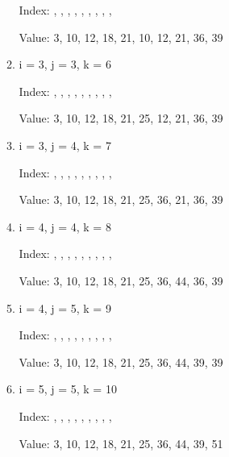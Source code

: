 \documentclass{article}
\begin{document}
\begin{itemize}
\begin{enumerate}
            Index: {, , , , , \space{}, \space{}, , , \space{}}
    
            Value: {3, 10, 12, 18, 21, 10, 12, 21, 36, 39}

        \item i = 3, j = 3, k = 6
        
            Index: {, , , , , \space{}, \space{}, , , \space{}}
    
            Value: {3, 10, 12, 18, 21, 25, 12, 21, 36, 39}

        \item i = 3, j = 4, k = 7
        
            Index: {, , , , , \space{}, \space{}, , , \space{}}
    
            Value: {3, 10, 12, 18, 21, 25, 36, 21, 36, 39}

        \item i = 4, j = 4, k = 8
        
            Index: {, , , , , \space{}, \space{}, , , \space{}}
    
            Value: {3, 10, 12, 18, 21, 25, 36, 44, 36, 39}

        \item i = 4, j = 5, k = 9
        
            Index: {, , , , , \space{}, \space{}, , , \space{}}
    
            Value: {3, 10, 12, 18, 21, 25, 36, 44, 39, 39}

        \item i = 5, j = 5, k = 10
        
            Index: {, , , , , \space{}, \space{}, , , \space{}}
    
            Value: {3, 10, 12, 18, 21, 25, 36, 44, 39, 51}
    \end{enumerate}
\end{itemize}
\end{document}
